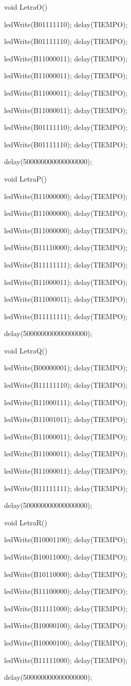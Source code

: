 \documentclass{article}
\begin{document}
void LetraO(){
   
   ledWrite(B01111110); delay(TIEMPO);
   
   ledWrite(B01111110); delay(TIEMPO);
   
   ledWrite(B11000011); delay(TIEMPO);
   
   ledWrite(B11000011); delay(TIEMPO);
   
   ledWrite(B11000011); delay(TIEMPO);
   
   ledWrite(B11000011); delay(TIEMPO);
   
   ledWrite(B01111110); delay(TIEMPO);
   
   ledWrite(B01111110); delay(TIEMPO);
  
  delay(500000000000000000);}

void LetraP(){

   ledWrite(B11000000); delay(TIEMPO);

   ledWrite(B11000000); delay(TIEMPO);

   ledWrite(B11000000); delay(TIEMPO);

   ledWrite(B11110000); delay(TIEMPO);

   ledWrite(B11111111); delay(TIEMPO);

   ledWrite(B11000011); delay(TIEMPO);

   ledWrite(B11000011); delay(TIEMPO);

   ledWrite(B11111111); delay(TIEMPO);

  delay(500000000000000000);}

void LetraQ(){

   ledWrite(B00000001); delay(TIEMPO);

   ledWrite(B11111110); delay(TIEMPO);

   ledWrite(B11000111); delay(TIEMPO);

   ledWrite(B11001011); delay(TIEMPO);

   ledWrite(B11000011); delay(TIEMPO);

   ledWrite(B11000011); delay(TIEMPO);

   ledWrite(B11000011); delay(TIEMPO);

   ledWrite(B11111111); delay(TIEMPO);

   delay(500000000000000000);}

void LetraR(){

   ledWrite(B10001100); delay(TIEMPO);

   ledWrite(B10011000); delay(TIEMPO);

   ledWrite(B10110000); delay(TIEMPO);

   ledWrite(B11100000); delay(TIEMPO);

   ledWrite(B11111000); delay(TIEMPO);

   ledWrite(B10000100); delay(TIEMPO);

   ledWrite(B10000100); delay(TIEMPO);

   ledWrite(B11111000); delay(TIEMPO);

   delay(500000000000000000);}
\end{document}
